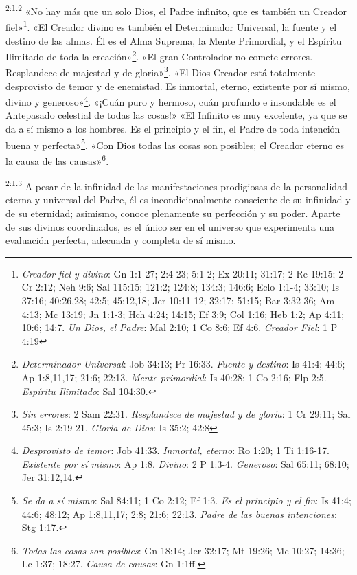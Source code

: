 \par
\textsuperscript{2:1.2} «No hay más que un solo Dios, el Padre infinito, que es también un Creador fiel»\footnote{\textit{Creador fiel y divino}: Gn 1:1-27; 2:4-23; 5:1-2; Ex 20:11; 31:17; 2 Re 19:15; 2 Cr 2:12; Neh 9:6; Sal 115:15; 121:2; 124:8; 134:3; 146:6; Eclo 1:1-4; 33:10; Is 37:16; 40:26,28; 42:5; 45:12,18; Jer 10:11-12; 32:17; 51:15; Bar 3:32-36; Am 4:13; Mc 13:19; Jn 1:1-3; Hch 4:24; 14:15; Ef 3:9; Col 1:16; Heb 1:2; Ap 4:11; 10:6; 14:7. \textit{Un Dios, el Padre}: Mal 2:10; 1 Co 8:6; Ef 4:6. \textit{Creador Fiel}: 1 P 4:19}. «El Creador divino es también el Determinador Universal, la fuente y el destino de las almas. Él es el Alma Suprema, la Mente Primordial, y el Espíritu Ilimitado de toda la creación»\footnote{\textit{Determinador Universal}: Job 34:13; Pr 16:33. \textit{Fuente y destino}: Is 41:4; 44:6; Ap 1:8,11,17; 21:6; 22:13. \textit{Mente primordial}: Is 40:28; 1 Co 2:16; Flp 2:5. \textit{Espíritu Ilimitado}: Sal 104:30.}. «El gran Controlador no comete errores. Resplandece de majestad y de gloria»\footnote{\textit{Sin errores}: 2 Sam 22:31. \textit{Resplandece de majestad y de gloria}: 1 Cr 29:11; Sal 45:3; Is 2:19-21. \textit{Gloria de Dios}: Is 35:2; 42:8}. «El Dios Creador está totalmente desprovisto de temor y de enemistad. Es inmortal, eterno, existente por sí mismo, divino y generoso»\footnote{\textit{Desprovisto de temor}: Job 41:33. \textit{Inmortal, eterno}: Ro 1:20; 1 Ti 1:16-17. \textit{Existente por sí mismo}: Ap 1:8. \textit{Divino}: 2 P 1:3-4. \textit{Generoso}: Sal 65:11; 68:10; Jer 31:12,14.}. «¡Cuán puro y hermoso, cuán profundo e insondable es el Antepasado celestial de todas las cosas!» «El Infinito es muy excelente, ya que se da a sí mismo a los hombres. Es el principio y el fin, el Padre de toda intención buena y perfecta»\footnote{\textit{Se da a sí mismo}: Sal 84:11; 1 Co 2:12; Ef 1:3. \textit{Es el principio y el fin}: Is 41:4; 44:6; 48:12; Ap 1:8,11,17; 2:8; 21:6; 22:13. \textit{Padre de las buenas intenciones}: Stg 1:17.}. «Con Dios todas las cosas son posibles; el Creador eterno es la causa de las causas»\footnote{\textit{Todas las cosas son posibles}: Gn 18:14; Jer 32:17; Mt 19:26; Mc 10:27; 14:36; Lc 1:37; 18:27. \textit{Causa de causas}: Gn 1:1ff.}.

\par
\textsuperscript{2:1.3} A pesar de la infinidad de las manifestaciones prodigiosas de la personalidad eterna y universal del Padre, él es incondicionalmente consciente de su infinidad y de su eternidad; asimismo, conoce plenamente su perfección y su poder. Aparte de sus divinos coordinados, es el único ser en el universo que experimenta una evaluación perfecta, adecuada y completa de sí mismo.

